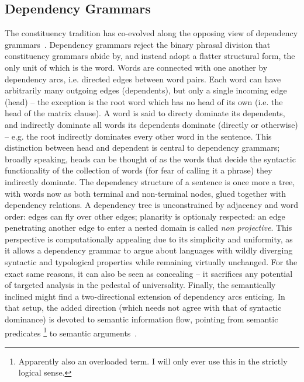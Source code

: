 \subsection{Dependency Grammars}
\label{subsection:dep_grammars}
The constituency tradition has co-evolved along the opposing view of dependency grammars~\cite[\textit{inter alia}]{tesniere2015elements,gaifman1965dependency,sgall1986meaning,mel1988dependency,sleator1995parsing}.
Dependency grammars reject the binary phrasal division that constituency grammars abide by, and instead adopt a flatter structural form, the only unit of which is the word.
Words are connected with one another by dependency arcs, i.e. directed edges between word pairs.
Each word can have arbitrarily many outgoing edges (dependents), but only a single incoming edge (head) -- the exception is the root word which has no head of its own (i.e. the head of the matrix clause).
A word is said to directy dominate its dependents, and indirectly dominate all words its dependents dominate (directly or otherwise) -- e.g. the root indirectly dominates every other word in the sentence.
This distinction between head and dependent is central to dependency grammars; broadly speaking, heads can be thought of as the words that decide the syntactic functionality of the collection of words (for fear of calling it a phrase) they indirectly dominate.
The dependency structure of a sentence is once more a tree, with words now as both terminal and non-terminal nodes, glued together with dependency relations.
A dependency tree is unconstrained by adjacency and word order: edges can fly over other edges; planarity is optionaly respected: an edge penetrating another edge to enter a nested domain is called \textit{non projective}.
This perspective is computationally appealing due to its simplicity and uniformity, as it allows a dependency grammar to argue about languages with wildly diverging syntactic and typological properties while remaining virtually unchanged.
For the exact same reasons, it can also be seen as concealing -- it sacrifices any potential of targeted analysis in the pedestal of universality.
Finally, the semantically inclined might find a two-directional extension of dependency arcs enticing.
In that setup, the added direction (which needs not agree with that of syntactic dominance) is devoted to semantic information flow, pointing from semantic predicates%
	\footnote{Apparently also an overloaded term. I will only ever use this in the strictly logical sense.}
 to semantic arguments~\cite{mel2003levels}.

